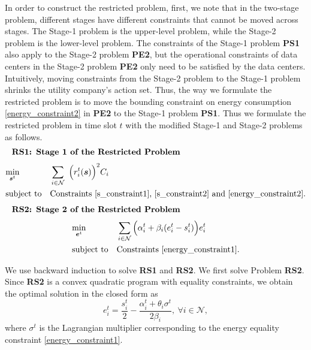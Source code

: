 \documentclass[journal]{IEEEtran}
\begin{document}
	In order to construct the restricted problem, first, we note that in the two-stage problem, different stages have different constraints that cannot be moved across stages. The Stage-1 problem is the upper-level problem, while the Stage-2 problem is the lower-level problem. The constraints of the Stage-1 problem \textbf{PS1} also apply to the Stage-2 problem \textbf{PE2}, but the operational constraints of data centers in the Stage-2 problem \textbf{PE2} only need to be satisfied by the data centers. Intuitively, moving constraints from the Stage-2 problem to the Stage-1 problem shrinks the utility company's action set. Thus, the way we formulate the restricted problem is to move the bounding constraint on energy consumption \eqref{energy_constraint2} in \textbf{PE2} to the Stage-1 problem \textbf{PS1}. Thus we formulate the restricted problem in time slot $t$ with the modified Stage-1 and Stage-2 problems as follows. 
	\begin{align*}
		\leftline{\textbf{RS1: Stage 1 of the Restricted Problem}}
	\end{align*}
	\begin{equation*}
		\begin{aligned}
			& \underset{\boldsymbol{s}^{t}} {\min}
			& &  \sum_{i \in \mathcal{N}}
			~ \Big( r_{i}^{t}(\boldsymbol{s}) \Big) ^{2} C_{i} \\
			& \text{subject to}
			& & \text{Constraints \eqref{s_constraint1}, \eqref{s_constraint2} and \eqref{energy_constraint2}}.
		\end{aligned}
	\end{equation*}
	\begin{align*}
		\leftline{\textbf{RS2: Stage 2 of the Restricted Problem}}
	\end{align*}
	\begin{equation*}
		\begin{aligned}
			& \underset{\boldsymbol{e}^{t}} {\min}
			& & \sum_{i \in \mathcal{N}}
			\Big( \alpha_{i}^{t} +\beta_{i} (e_{i}^{t}-s_{i}^{t}) \Big) e_{i}^{t} \\
			& \text{subject to}
			& & \text{Constraints \eqref{energy_constraint1}}.
		\end{aligned}
	\end{equation*}
	
	We use backward induction to solve \textbf{RS1} and \textbf{RS2}. We first solve Problem \textbf{RS2}. Since \textbf{RS2} is a convex quadratic program with equality constraints, we obtain the optimal solution in the closed form as
	\begin{equation}
	e_{i}^{t}= \frac {s_{i}^{t}}{2} - \frac {\alpha_{i}^{t}+ \theta_i \sigma^t} {2  \beta_{i}},~\forall i \in \mathcal{N}, \label{RSsolution}
	\end{equation}
	where $\sigma^{t}$ is the Lagrangian multiplier corresponding to the energy equality constraint \eqref{energy_constraint1}.
	
\end{document}
